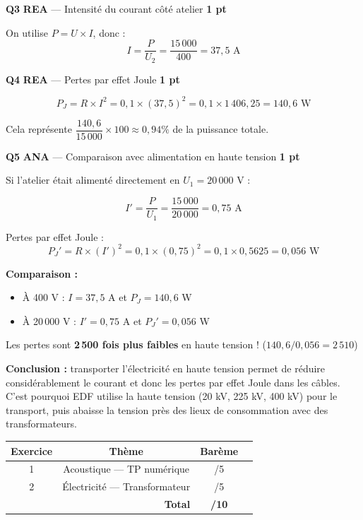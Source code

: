 \documentclass[a4paper,11pt]{article}
\newcommand{\pts}[1]{\hfill\textcolor{gris}{\small\textbf{#1}}}
\newcommand{\comp}[1]{\colorbox{blue!10}{\scriptsize\textbf{#1}}}
\begin{document}
\textbf{Q3} \comp{REA} — Intensité du courant côté atelier \pts{1 pt}

\begin{reponsecorr}
On utilise $P = U \times I$, donc :
$$I = \frac{P}{U_2} = \frac{15\,000}{400} = \boxed{37{,}5 \text{ A}}$$
\end{reponsecorr}

\textbf{Q4} \comp{REA} — Pertes par effet Joule \pts{1 pt}

\begin{reponsecorr}
$$P_J = R \times I^2 = 0{,}1 \times (37{,}5)^2 = 0{,}1 \times 1\,406{,}25 = \boxed{140{,}6 \text{ W}}$$

Cela représente $\dfrac{140{,}6}{15\,000} \times 100 \approx 0{,}94\%$ de la puissance totale.
\end{reponsecorr}

\textbf{Q5} \comp{ANA} — Comparaison avec alimentation en haute tension \pts{1 pt}

\begin{reponsecorr}
Si l'atelier était alimenté directement en $U_1 = 20\,000$ V :

$$I' = \frac{P}{U_1} = \frac{15\,000}{20\,000} = 0{,}75 \text{ A}$$

Pertes par effet Joule :
$$P_J' = R \times (I')^2 = 0{,}1 \times (0{,}75)^2 = 0{,}1 \times 0{,}5625 = \boxed{0{,}056 \text{ W}}$$

\textbf{Comparaison :}
\begin{itemize}[nosep]
  \item À 400 V : $I = 37{,}5$ A et $P_J = 140{,}6$ W
  \item À 20\,000 V : $I' = 0{,}75$ A et $P_J' = 0{,}056$ W
\end{itemize}

Les pertes sont \textbf{2\,500 fois plus faibles} en haute tension ! ($140{,}6 / 0{,}056 = 2\,510$)

\textbf{Conclusion :} transporter l'électricité en haute tension permet de réduire considérablement le courant et donc les pertes par effet Joule dans les câbles. C'est pourquoi EDF utilise la haute tension (20 kV, 225 kV, 400 kV) pour le transport, puis abaisse la tension près des lieux de consommation avec des transformateurs.
\end{reponsecorr}

\vfill

\begin{center}
\begin{tabular}{|c|c|c|c|}
\hline
\textbf{Exercice} & \textbf{Thème} & \textbf{Barème} \\
\hline
1 & Acoustique — TP numérique & /5 \\
\hline
2 & Électricité — Transformateur & /5 \\
\hline
\multicolumn{2}{|r|}{\textbf{Total}} & \textbf{/10} \\
\hline
\end{tabular}
\end{center}
\end{document}
